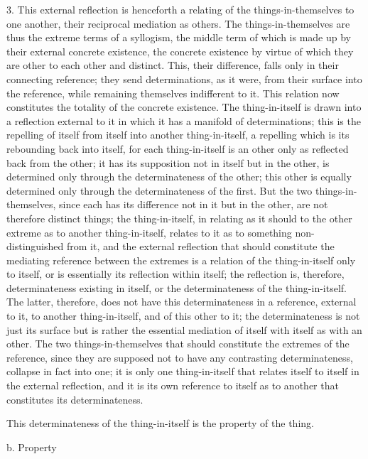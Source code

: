 3. This external reflection is henceforth a relating of
the things-in-themselves to one another, their reciprocal mediation as others.
The things-in-themselves are thus the extreme terms of a syllogism,
the middle term of which is made up by their external concrete existence,
the concrete existence by virtue of which they are other to each other and distinct.
This, their difference, falls only in their connecting reference;
they send determinations, as it were, from their surface into the reference,
while remaining themselves indifferent to it.
This relation now constitutes the totality of the concrete existence.
The thing-in-itself is drawn into a reflection external to it
in which it has a manifold of determinations;
this is the repelling of itself from itself into another thing-in-itself,
a repelling which is its rebounding back into itself,
for each thing-in-itself is an other
only as reflected back from the other;
it has its supposition not in itself but in the other,
is determined only through the determinateness of the other;
this other is equally determined only through the determinateness of the first.
But the two things-in-themselves, since each has its difference
not in it but in the other, are not therefore distinct things;
the thing-in-itself, in relating as it should to
the other extreme as to another thing-in-itself,
relates to it as to something non-distinguished from it,
and the external reflection that should constitute
the mediating reference between the extremes is a
relation of the thing-in-itself only to itself,
or is essentially its reflection within itself;
the reflection is, therefore, determinateness existing in itself,
or the determinateness of the thing-in-itself.
The latter, therefore, does not have this determinateness
in a reference, external to it,
to another thing-in-itself,
and of this other to it;
the determinateness is not just its surface
but is rather the essential mediation of
itself with itself as with an other.
The two things-in-themselves that should
constitute the extremes of the reference,
since they are supposed not
to have any contrasting determinateness,
collapse in fact into one;
it is only one thing-in-itself that
relates itself to itself in the external reflection,
and it is its own reference to itself as to another
that constitutes its determinateness.

This determinateness of the thing-in-itself is the property of the thing.

b. Property


